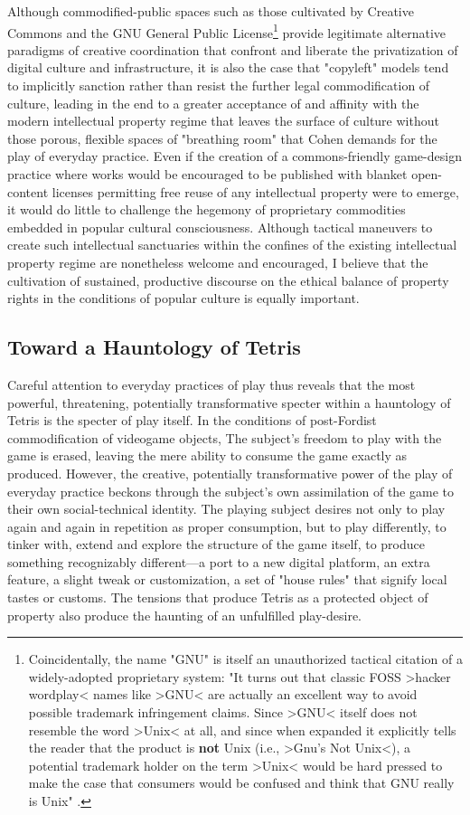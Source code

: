 Although commodified-public spaces such as those cultivated by Creative Commons and the GNU General Public License\footnote{
  Coincidentally, the name "GNU" is itself an unauthorized tactical citation of a widely-adopted proprietary system: "It turns out that classic FOSS >hacker wordplay< names like >GNU< are actually an excellent way to avoid possible trademark infringement claims. Since >GNU< itself does not resemble the word >Unix< at all, and since when expanded it explicitly tells the reader that the product is \textbf{not} Unix (i.e., >Gnu's Not Unix<), a potential trademark holder on the term >Unix< would be hard pressed to make the case that consumers would be confused and think that GNU really is Unix" \autocite[5.8n2]{SFLC2008}.
}
provide legitimate alternative paradigms of creative coordination that confront and liberate the privatization of digital culture and infrastructure, it is also the case that "copyleft" models tend to implicitly sanction rather than resist the further legal commodification of culture, leading in the end to a greater acceptance of and affinity with the modern intellectual property regime that leaves the surface of culture without those porous, flexible spaces of "breathing room" that Cohen demands for the play of everyday practice. Even if the creation of a commons-friendly game-design practice where works would be encouraged to be published with blanket open-content licenses permitting free reuse of any intellectual property were to emerge, it would do little to challenge the hegemony of proprietary commodities embedded in popular cultural consciousness. Although tactical maneuvers to create such intellectual sanctuaries within the confines of the existing intellectual property regime are nonetheless welcome and encouraged, I believe that the cultivation of sustained, productive discourse on the ethical balance of property rights in the conditions of popular culture is equally important.

\subsection*{Toward a Hauntology of Tetris}
Careful attention to everyday practices of play thus reveals that the most powerful, threatening, potentially transformative specter within a hauntology of Tetris is the specter of play itself. In the conditions of post-Fordist commodification of videogame objects, The subject's freedom to play with the game is erased, leaving the mere ability to consume the game exactly as produced. However, the creative, potentially transformative power of the play of everyday practice beckons through the subject's own assimilation of the game to their own social-technical identity. The playing subject desires not only to play again and again in repetition as proper consumption, but to play differently, to tinker with, extend and explore the structure of the game itself, to produce something recognizably different---a port to a new digital platform, an extra feature, a slight tweak or customization, a set of "house rules" that signify local tastes or customs. The tensions that produce Tetris as a protected object of property also produce the haunting of an unfulfilled play-desire.

